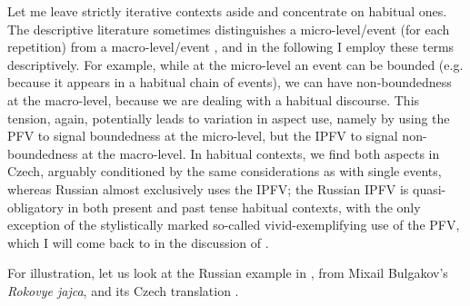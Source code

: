 \documentclass[output=paper,colorlinks,citecolor=brown]{langscibook}
\begin{document}
Let me leave strictly iterative contexts aside and concentrate on habitual ones. The descriptive literature sometimes distinguishes a micro-level/event (for each repetition) from a macro-level/event \citep[see, e.g.,][]{eckert84,stunova93}, and in the following I employ these terms descriptively. For example, while at the micro-level an event can be bounded (e.g. because it appears in a habitual chain of events), we can have non-boundedness at the macro-level, because we are dealing with a habitual discourse. This tension, again, potentially leads to variation in aspect use, namely by using the PFV to signal boundedness at the micro-level, but the IPFV to signal non-boundedness at the macro-level. In habitual contexts, we find both aspects in Czech, arguably conditioned by the same considerations as with single events, whereas Russian almost exclusively uses the IPFV; the Russian IPFV is quasi-obligatory in both present and past tense habitual contexts, with the only exception of the stylistically marked so-called vivid-exemplifying use of the PFV, which I will come back to in the discussion of . 

For illustration, let us look at the Russian example in , from Mixail Bulgakov's \textit{Rokovye jajca}, and its Czech translation \citep[adapted from][87]{gehrke02}. 
\end{document}
